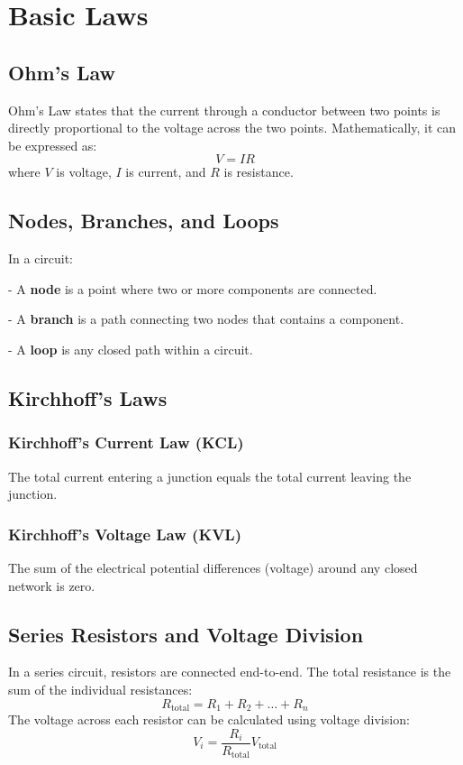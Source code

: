 \documentclass[openany]{book}
\begin{document}
\chapter{Basic Laws}
\section{Ohm's Law}
Ohm's Law states that the current through a conductor between two points is directly proportional to the voltage across the two points. Mathematically, it can be expressed as:
\[
    V = IR
\]
where \(V\) is voltage, \(I\) is current, and \(R\) is resistance.

\section{Nodes, Branches, and Loops}
In a circuit:

- A \textbf{node} is a point where two or more components are connected.

- A \textbf{branch} is a path connecting two nodes that contains a component.

- A \textbf{loop} is any closed path within a circuit.

\section{Kirchhoff's Laws}
\subsection{Kirchhoff's Current Law (KCL)}
The total current entering a junction equals the total current leaving the junction.

\subsection{Kirchhoff's Voltage Law (KVL)}
The sum of the electrical potential differences (voltage) around any closed network is zero.

\section{Series Resistors and Voltage Division}
In a series circuit, resistors are connected end-to-end. The total resistance is the sum of the individual resistances:
\[
    R_{\text{total}} = R_1 + R_2 + \ldots + R_n
\]
The voltage across each resistor can be calculated using voltage division:
\[
    V_i = \frac{R_i}{R_{\text{total}}} V_{\text{total}}
\]
\end{document}
